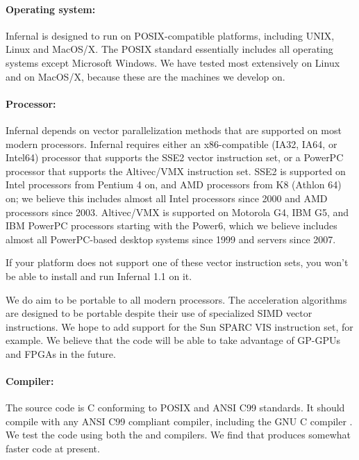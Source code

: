 \paragraph{Operating system:} Infernal is designed to run on
POSIX-compatible platforms, including UNIX, Linux and MacOS/X. The
POSIX standard essentially includes all operating systems except
Microsoft Windows. We have tested most extensively on Linux and on
MacOS/X, because these are the machines we develop on.

\paragraph{Processor:} Infernal depends on vector parallelization methods
that are supported on most modern processors. Infernal requires either an
x86-compatible (IA32, IA64, or Intel64) processor that supports the
SSE2 vector instruction set, or a PowerPC processor that supports the
Altivec/VMX instruction set. SSE2 is supported on Intel processors
from Pentium 4 on, and AMD processors from K8 (Athlon 64) on; we
believe this includes almost all Intel processors since 2000 and AMD
processors since 2003. Altivec/VMX is supported on Motorola G4, IBM
G5, and IBM PowerPC processors starting with the Power6, which we
believe includes almost all PowerPC-based desktop systems since 1999
and servers since 2007.

If your platform does not support one of these vector instruction
sets, you won't be able to install and run Infernal 1.1 on it.

We do aim to be portable to all modern processors. The acceleration
algorithms are designed to be portable despite their use of
specialized SIMD vector instructions. We hope to add support for the
Sun SPARC VIS instruction set, for example. We believe that the code
will be able to take advantage of GP-GPUs and FPGAs in the future.

\paragraph{Compiler:} The source code is C conforming to POSIX and ANSI
C99 standards. It should compile with any ANSI C99 compliant compiler,
including the GNU C compiler . We test the code using both
the  and  compilers. We find that 
produces somewhat faster code at present.

